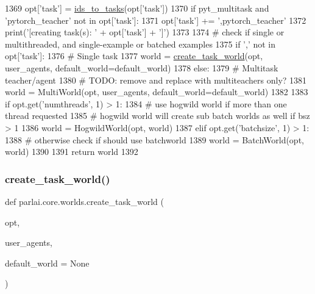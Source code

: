 \begin{DoxyCode}
1369     opt[\textcolor{stringliteral}{'task'}] = \hyperlink{namespaceparlai_1_1tasks_1_1tasks_ad536d1295ca5ba2ecf3a48635b482087}{ids\_to\_tasks}(opt[\textcolor{stringliteral}{'task'}])
1370     \textcolor{keywordflow}{if} pyt\_multitask \textcolor{keywordflow}{and} \textcolor{stringliteral}{'pytorch\_teacher'} \textcolor{keywordflow}{not} \textcolor{keywordflow}{in} opt[\textcolor{stringliteral}{'task'}]:
1371         opt[\textcolor{stringliteral}{'task'}] += \textcolor{stringliteral}{',pytorch\_teacher'}
1372     print(\textcolor{stringliteral}{'[creating task(s): '} + opt[\textcolor{stringliteral}{'task'}] + \textcolor{stringliteral}{']'})
1373 
1374     \textcolor{comment}{# check if single or multithreaded, and single-example or batched examples}
1375     \textcolor{keywordflow}{if} \textcolor{stringliteral}{','} \textcolor{keywordflow}{not} \textcolor{keywordflow}{in} opt[\textcolor{stringliteral}{'task'}]:
1376         \textcolor{comment}{# Single task}
1377         world = \hyperlink{namespaceparlai_1_1core_1_1worlds_a055ee493c9ed03ecff4832f52b408f8c}{create\_task\_world}(opt, user\_agents, default\_world=default\_world)
1378     \textcolor{keywordflow}{else}:
1379         \textcolor{comment}{# Multitask teacher/agent}
1380         \textcolor{comment}{# TODO: remove and replace with multiteachers only?}
1381         world = MultiWorld(opt, user\_agents, default\_world=default\_world)
1382 
1383     \textcolor{keywordflow}{if} opt.get(\textcolor{stringliteral}{'numthreads'}, 1) > 1:
1384         \textcolor{comment}{# use hogwild world if more than one thread requested}
1385         \textcolor{comment}{# hogwild world will create sub batch worlds as well if bsz > 1}
1386         world = HogwildWorld(opt, world)
1387     \textcolor{keywordflow}{elif} opt.get(\textcolor{stringliteral}{'batchsize'}, 1) > 1:
1388         \textcolor{comment}{# otherwise check if should use batchworld}
1389         world = BatchWorld(opt, world)
1390 
1391     \textcolor{keywordflow}{return} world
1392 \end{DoxyCode}
\mbox{\label{namespaceparlai_1_1core_1_1worlds_a055ee493c9ed03ecff4832f52b408f8c}} 
\subsubsection{\texorpdfstring{create\+\_\+task\+\_\+world()}{create\_task\_world()}}
{\footnotesize\ttfamily def parlai.\+core.\+worlds.\+create\+\_\+task\+\_\+world (\begin{DoxyParamCaption}\item[{}]{opt,  }\item[{}]{user\+\_\+agents,  }\item[{}]{default\+\_\+world = {\ttfamily None} }\end{DoxyParamCaption})}

